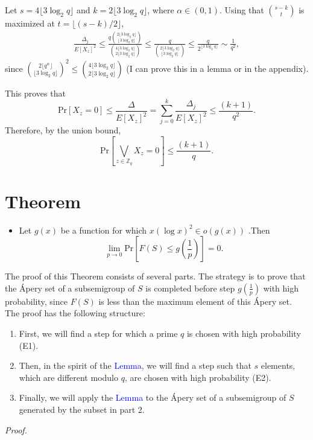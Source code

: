 Let $s = 4\lfloor 3 \log_2 q \rfloor$ and $k = 2\lfloor 3 \log_2 q \rfloor$, where $\alpha \in (0, 1)$. Using that ${s - k \choose t}$ is maximized at $t = \lfloor (s - k) / 2\rfloor$,
\begin{align*}
\frac{\Delta_j}{E[X_z]^2} \leq \frac{q {2\lfloor 3 \log_2 q\rfloor\choose \lfloor 3 \log_2 q \rfloor}}{{4\lfloor 3\log_2 q \rfloor \choose 2\lfloor 3\log_2 q \rfloor}} \leq \frac{q}{{2\lfloor 3 \log_2 q \rfloor \choose \lfloor 3 \log_2 q \rfloor}} \leq \frac{q}{2^{\lfloor 3 \log_2 q \rfloor}} \sim \frac{1}{q^2},
\end{align*}
since \({2\lfloor q^{\alpha} \rfloor \choose \lfloor 3 \log_2 q \rfloor}^2 \leq {4\lfloor 3 \log_2 q \rfloor \choose 2\lfloor 3 \log_2 q \rfloor}\) (I can prove this in a lemma or in the appendix).   \par
This proves that
\[\text{Pr}[X_z = 0] \leq \frac{\Delta}{E[X_z]^2} = \sum_{j = 0}^k \frac{\Delta_j}{E[X_z]^2} \leq \frac{(k + 1)}{q^2}.\]
Therefore, by the union bound,
\[\text{Pr}[\bigvee_{z \in \mathbb{Z}_q} X_z = 0] \leq \frac{(k + 1)}{q}.\]

\section{Theorem} 
\begin{itemize}
    \item Let $g(x)$ be a function for which $x(\log x)^2 \in o(g(x))$ .Then
\[\lim_{p \to 0}\text{Pr}\left[F(S) \leq g\left(\frac{1}{p}\right)\right] = 0.\] 
\end{itemize}

\par The proof of this Theorem consists of several parts. The strategy is to prove that the Ápery set of a subsemigroup of $S$ is completed before step $g\left(\frac{1}{p}\right)$ with high probability, since $F(S)$ is less than the maximum element of this Ápery set. The proof has the following structure: 
\begin{enumerate}
\item First, we will find a step for which a prime $q$ is chosen with high probability (E1). 
\item Then, in the spirit of the \textcolor{blue}{Lemma}, we will find a step such that $s$ elements, which are different modulo $q$, are chosen with high probability (E2). 
\item Finally, we will apply the \textcolor{blue}{Lemma} to the Ápery set of a subsemigroup of $S$ generated by the subset in part 2. 
\end{enumerate}
\textit{Proof. }
